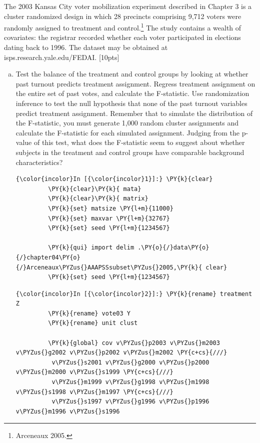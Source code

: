 \documentclass[11pt,notitlepage]{article}\usepackage[]{graphicx}\usepackage[]{color}
\makeatletter
\newenvironment{kframe}{%
 \def\at@end@of@kframe{}%
 \ifinner\ifhmode%
  \def\at@end@of@kframe{\end{minipage}}%
  \begin{minipage}{\columnwidth}%
 \fi\fi%
 \def\FrameCommand##1{\hskip\@totalleftmargin \hskip-\fboxsep
 \colorbox{shadecolor}{##1}\hskip-\fboxsep
     \hskip-\linewidth \hskip-\@totalleftmargin \hskip\columnwidth}%
 \MakeFramed {\advance\hsize-\width
   \@totalleftmargin\z@ \linewidth\hsize
   \@setminipage}}%
 {\par\unskip\endMakeFramed%
 \at@end@of@kframe}
\newenvironment{knitrout}{}{} %
\makeatother
\begin{document}
The 2003 Kansas City voter mobilization experiment described in Chapter 3 is a cluster randomized design in which 28 precincts comprising 9,712 voters were randomly assigned to treatment and control.\footnote{Arceneaux 2005.} The study contains a wealth of covariates: the registrar recorded whether each voter participated in elections dating back to 1996.  The dataset may be obtained at isps.research.yale.edu/FEDAI. [10pts]

\begin{enumerate}[a)]

\item Test the balance of the treatment and control groups by looking at whether past turnout predicts treatment assignment.  Regress treatment assignment on the entire set of past votes, and calculate the F-statistic.  Use randomization inference to test the null hypothesis that none of the past turnout variables predict treatment assignment. Remember that to simulate the distribution of the F-statistic, you must generate 1,000 random cluster assignments and calculate the F-statistic for each simulated assignment.  Judging from the p-value of this test, what does the F-statistic seem to suggest about whether subjects in the treatment and control groups have comparable background characteristics?  

\begin{knitrout}
\color{fgcolor}\begin{kframe}
   \begin{Verbatim}[commandchars=\\\{\}]
{\color{incolor}In [{\color{incolor}1}]:} \PY{k}{clear}
         \PY{k}{clear}\PY{k}{ mata}
         \PY{k}{clear}\PY{k}{ matrix}
         \PY{k}{set} matsize \PY{l+m}{11000} 
         \PY{k}{set} maxvar \PY{l+m}{32767}
         \PY{k}{set} seed \PY{l+m}{1234567}
         
         \PY{k}{qui} import delim .\PY{o}{/}data\PY{o}{/}chapter04\PY{o}{/}Arceneaux\PYZus{}AAAPSSsubset\PYZus{}2005,\PY{k}{ clear}
         \PY{k}{set} seed \PY{l+m}{1234567}
\end{Verbatim}

    \begin{Verbatim}[commandchars=\\\{\}]
{\color{incolor}In [{\color{incolor}2}]:} \PY{k}{rename} treatment Z
         \PY{k}{rename} vote03 Y
         \PY{k}{rename} unit clust
         
         \PY{k}{global} cov v\PYZus{}p2003 v\PYZus{}m2003 v\PYZus{}g2002 v\PYZus{}p2002 v\PYZus{}m2002 \PY{c+cs}{///}
          v\PYZus{}s2001 v\PYZus{}g2000 v\PYZus{}p2000 v\PYZus{}m2000 v\PYZus{}s1999 \PY{c+cs}{///}
          v\PYZus{}m1999 v\PYZus{}g1998 v\PYZus{}m1998 v\PYZus{}s1998 v\PYZus{}m1997 \PY{c+cs}{///}
          v\PYZus{}s1997 v\PYZus{}g1996 v\PYZus{}p1996 v\PYZus{}m1996 v\PYZus{}s1996
\end{Verbatim}


\end{kframe}
\end{knitrout}
\end{enumerate}
\end{document}
